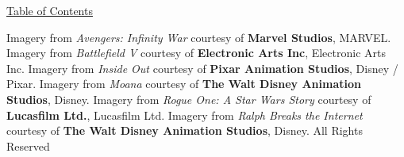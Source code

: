 \documentclass[a4paper]{report}
\begin{document}
\maketitle




\begin{center}
    \Large{\href{./cinematic-color.html}{Table of Contents}}
\end{center}

\noindent\footnotesize{
    Imagery from \textit{Avengers: Infinity War} courtesy of \textbf{Marvel Studios},  MARVEL.
    Imagery from \textit{Battlefield V} courtesy of \textbf{Electronic Arts Inc},  Electronic Arts Inc.
    Imagery from \textit{Inside Out} courtesy of \textbf{Pixar Animation Studios},  Disney / Pixar.
    Imagery from \textit{Moana} courtesy of \textbf{The Walt Disney Animation Studios},  Disney.
    Imagery from \textit{Rogue One: A Star Wars Story} courtesy of \textbf{Lucasfilm Ltd.},  Lucasfilm Ltd.
    Imagery from \textit{Ralph Breaks the Internet} courtesy of \textbf{The  Walt Disney Animation Studios},  Disney. All Rights Reserved
}
\end{document}
